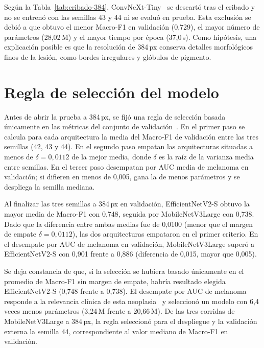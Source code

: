 Según la Tabla~\ref{tab:cribado-384}, ConvNeXt-Tiny~\cite{liu2022convnext} se descartó tras el cribado y no se entrenó con las semillas 43 y 44 ni se evaluó en prueba. Esta exclusión se debió a que obtuvo el menor Macro-F1 en validación (0,729), el mayor número de parámetros (28,02\,M) y el mayor tiempo por época (37,0\,s). Como hipótesis, una explicación posible es que la resolución de 384\,px conserva detalles morfológicos finos de la lesión, como bordes irregulares y glóbulos de pigmento.

\section{Regla de selección del modelo}

Antes de abrir la prueba a 384\,px, se fijó una regla de selección basada únicamente en las métricas del conjunto de validación~\cite{kapoor2023leakage,maierhein2024metrics}. En el primer paso se calcula para cada arquitectura la media del Macro-F1 de validación entre las tres semillas (42, 43 y 44). En el segundo paso empatan las arquitecturas situadas a menos de $\delta = 0{,}0112$ de la mejor media, donde $\delta$ es la raíz de la varianza media entre semillas. En el tercer paso desempatan por AUC media de melanoma en validación; si difieren en menos de 0,005, gana la de menos parámetros y se despliega la semilla mediana.

Al finalizar las tres semillas a 384\,px en validación, EfficientNetV2-S obtuvo la mayor media de Macro-F1 con 0,748, seguida por MobileNetV3Large con 0,738. Dado que la diferencia entre ambas medias fue de 0,0100 (menor que el margen de empate $\delta = 0{,}0112$), las dos arquitecturas empataron en el primer criterio. En el desempate por AUC de melanoma en validación, MobileNetV3Large superó a EfficientNetV2-S con 0,901 frente a 0,886 (diferencia de 0,015, mayor que 0,005).

Se deja constancia de que, si la selección se hubiera basado únicamente en el promedio de Macro-F1 sin margen de empate, habría resultado elegida EfficientNetV2-S (0,748 frente a 0,738). El desempate por AUC de melanoma responde a la relevancia clínica de esta neoplasia~\cite{amaral2025esmo,maierhein2024metrics} y seleccionó un modelo con 6,4 veces menos parámetros (3,24\,M frente a 20,66\,M). De las tres corridas de MobileNetV3Large a 384\,px, la regla seleccionó para el despliegue y la validación externa la semilla 44, correspondiente al valor mediano de Macro-F1 en validación.


